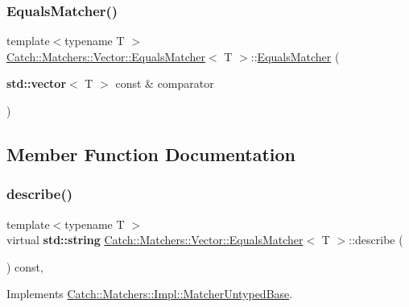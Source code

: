 \subsubsection{\texorpdfstring{Equals\+Matcher()}{EqualsMatcher()}}
{\footnotesize\ttfamily template$<$typename T $>$ \\
\hyperlink{struct_catch_1_1_matchers_1_1_vector_1_1_equals_matcher}{Catch\+::\+Matchers\+::\+Vector\+::\+Equals\+Matcher}$<$ T $>$\+::\hyperlink{struct_catch_1_1_matchers_1_1_vector_1_1_equals_matcher}{Equals\+Matcher} (\begin{DoxyParamCaption}\item[{\textbf{ std\+::vector}$<$ T $>$ const \&}]{comparator }\end{DoxyParamCaption})\hspace{0.3cm}{\ttfamily [inline]}}



\subsection{Member Function Documentation}
\mbox{\label{struct_catch_1_1_matchers_1_1_vector_1_1_equals_matcher_aca79ade26f4a75b2a57005067e086e35}} 
\subsubsection{\texorpdfstring{describe()}{describe()}}
{\footnotesize\ttfamily template$<$typename T $>$ \\
virtual \textbf{ std\+::string} \hyperlink{struct_catch_1_1_matchers_1_1_vector_1_1_equals_matcher}{Catch\+::\+Matchers\+::\+Vector\+::\+Equals\+Matcher}$<$ T $>$\+::describe (\begin{DoxyParamCaption}{ }\end{DoxyParamCaption}) const\hspace{0.3cm}{\ttfamily [inline]}, {\ttfamily [virtual]}}



Implements \hyperlink{class_catch_1_1_matchers_1_1_impl_1_1_matcher_untyped_base_a91d3a907dbfcbb596077df24f6e11fe2}{Catch\+::\+Matchers\+::\+Impl\+::\+Matcher\+Untyped\+Base}.

